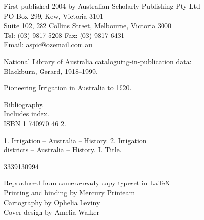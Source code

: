 \documentclass[11pt,b5paper,titlepage]{book}
\newcommand{\clearemptydoublepage}{\newpage{\pagestyle{empty}\cleardoublepage}}
\renewcommand{\headrulewidth}{0pt}%
\begin{document}
\begin{titlepage}
\begin{raggedright}
\bigskip
First published 2004 by Australian Scholarly Publishing Pty Ltd\\
PO Box 299, Kew, Victoria 3101\\
Suite 102, 282 Collins Street, Melbourne, Victoria 3000\\
Tel: (03) 9817 5208 \quad Fax: (03) 9817 6431\\
Email: aspic@ozemail.com.au


\bigskip
National Library of Australia cataloguing-in-publication data:\\

\medskip
Blackburn, Gerard, 1918--1999.
\begin{list}{}{\setlength{\topsep}{0ex}\setlength{\itemsep}{0ex}\setlength{\leftmargin}{2.5ex}}
\item
Pioneering Irrigation in Australia to 1920.
\item
Bibliography.\\
Includes index.\\
ISBN 1 740970 46 2.
\item
1. Irrigation -- Australia -- History. 2. Irrigation\\
districts -- Australia -- History. I. Title.
\end{list}
3339130994

\bigskip
Reproduced from camera-ready copy typeset in \LaTeX\\
Printing and binding by Mercury Printeam\\
Cartography by Ophelia Leviny\\
Cover design by Amelia Walker

\end{raggedright}
\clearemptydoublepage

\end{titlepage}

\pagestyle{plain}
\begin{spacing}{0.93}
\tableofcontents
\end{spacing}
\newpage


\clearemptydoublepage

\clearemptydoublepage

\mainmatter
\pagestyle{fancy}
\renewcommand{\headrulewidth}{0.4pt}
\fancyhead[LE,RO]{\sffamily \small \thepage}
\fancyfoot{}


\clearemptydoublepage

\clearemptydoublepage

\clearemptydoublepage

\clearemptydoublepage

\clearemptydoublepage

\clearemptydoublepage

\clearemptydoublepage

\clearemptydoublepage

\clearemptydoublepage

\clearemptydoublepage

\clearemptydoublepage

\clearemptydoublepage

\clearemptydoublepage

\clearemptydoublepage

\clearemptydoublepage
\end{document}
